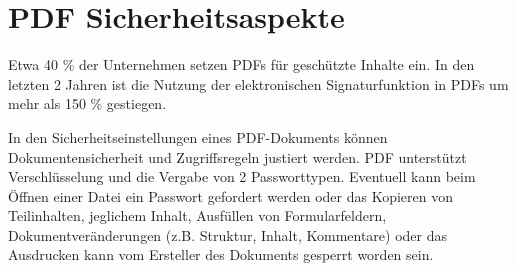 \section{PDF Sicherheitsaspekte}
Etwa 40 \% der Unternehmen setzen PDFs für geschützte Inhalte ein. In den letzten 2 Jahren ist die Nutzung der elektronischen Signaturfunktion in PDFs um mehr als 150 \% gestiegen. \cite{formilo}
\par
In den Sicherheitseinstellungen eines PDF-Dokuments können Dokumentensicherheit und Zugriffsregeln justiert werden. PDF unterstützt Verschlüsselung und die Vergabe von 2 Passworttypen. Eventuell kann beim Öffnen einer Datei ein Passwort gefordert werden oder das Kopieren von Teilinhalten, jeglichem Inhalt, Ausfüllen von Formularfeldern, Dokumentveränderungen (z.B. Struktur, Inhalt, Kommentare) oder das Ausdrucken kann vom Ersteller des Dokuments gesperrt worden sein. 